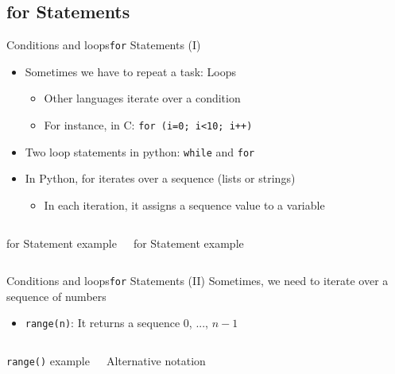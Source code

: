 \documentclass[10pt,compress]{beamer} %
\begin{document}
\subsection{for Statements}
\begin{frame}{Conditions and loops}{\texttt{for} Statements (I)}
	\begin{itemize}
		\item Sometimes we have to repeat a task: Loops
			\begin{itemize}
			\item Other languages iterate over a condition
			\item For instance, in C: \texttt{for (i=0; i<10; i++)}
			\end{itemize}
		\item Two loop statements in python: \texttt{while} and \texttt{for}
		\item In Python, for iterates over a sequence (lists or strings)
			\begin{itemize}
			\item In each iteration, it assigns a sequence value to a variable
			\end{itemize}
	\end{itemize}

    \begin{columns}
		\begin{block}{for Statement example}
		
		\end{block}


		\begin{block}{for Statement example}
		
		\end{block}
	\end{columns}
\end{frame}

\begin{frame}{Conditions and loops}{\texttt{for} Statements (II)}
	Sometimes, we need to iterate over a sequence of numbers
	\begin{itemize}
		\item \texttt{range(n)}: It returns a sequence $0$, ..., $n-1$
	\end{itemize}

    \begin{columns}
		\begin{block}{\texttt{range()} example}
		
		\end{block}
		
		\begin{block}{Alternative notation}
		
		\end{block}
	\end{columns}
\end{frame}
\end{document}
